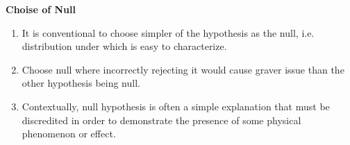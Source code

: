 \documentclass[11pt]{article}
\begin{document}
\begin{rem}
  \textbf{Choise of Null}
  \begin{enumerate}
    \item It is conventional to choose simpler of the hypothesis as the null, i.e. distribution under which is easy to characterize.
    \item Choose null where incorrectly rejecting it would cause graver issue than the other hypothesis being null.
    \item Contextually, null hypothesis is often a simple explanation that must be discredited in order to demonstrate the presence of some physical phenomenon or effect.
  \end{enumerate}
\end{rem}
\end{document}
